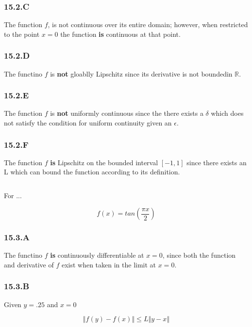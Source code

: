 \documentclass[12px]{article}
\newcommand{\R}{\mathbb{R}}
\begin{document}
\subsubsection*{15.2.C}

The function $f$, is not continuous over its entire domain; however, when restricted to the point $x=0$ the function \textbf{is} continuous at that point.

\subsubsection*{15.2.D}
The functino $f$ is \textbf{not} gloablly Lipschitz since its derivative is not boundedin $\R$.
\subsubsection*{15.2.E}

The function $f$ is \textbf{not} uniformly continuous since the there exists a $\delta$ which does not satisfy the condition for uniform continuity given an $\epsilon$.
\subsubsection*{15.2.F}

The function $f$ \textbf{is} Lipschitz on the bounded interval $[-1 , 1]$ since there exists an L which can bound the function according to its definition.


\subsection{}

For ...

$$
f(x) = tan\left( \frac{\pi x}{2}\right)
$$

\subsubsection*{15.3.A}
The functino $f$ \textbf{is} continuously differentiable at $x=0$, since both the function and derivative of $f$ exist when taken in the limit at $x=0$.

\subsubsection*{15.3.B}

Given $y =.25$ and $x=0$

$$
\left\Vert f(y) - f(x) \right\Vert \leq L \left\Vert y -x \right\Vert
$$
\end{document}
